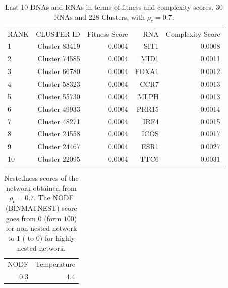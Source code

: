 \documentclass[10pt,a4paper]{article}
\begin{document}
 \begin{table}[h!]
\centering
\caption{\label{tab:tab2} Last 10 DNAs and RNAs in terms of fitness and complexity scores, 30 RNAs and 228 Clusters, with $\rho_{c} = 0.7$.}
\begin{tabular}{l|rr|rr|}
\cline{1-5}
RANK & CLUSTER ID & Fitness Score & RNA & Complexity Score\\
\cline{1-5}
1 & Cluster 83419 & 0.0004 & SIT1 & 0.0008\\
2 & Cluster 74585 & 0.0004 & MID1 & 0.0011\\
3 & Cluster 66780 & 0.0004 & FOXA1 & 0.0012\\
4 & Cluster 58323 & 0.0004 & CCR7 & 0.0013\\
5 & Cluster 55730 & 0.0004 & MLPH & 0.0013\\
6 & Cluster 49933 & 0.0004 & PRR15 & 0.0014\\
7 & Cluster 48271 & 0.0004 & IRF4 & 0.0015\\
8 & Cluster 24558 & 0.0004 & ICOS & 0.0017\\
9 & Cluster 24467 & 0.0004 & ESR1 & 0.0027\\
10 & Cluster 22095 & 0.0004 & TTC6 & 0.0031\\
\cline{1-5}
\end{tabular}
\end{table}
\begin{table}[h!]
\centering
\caption{\label{tab:tab3}Nestedness scores of the network obtained from $\rho_{c} = 0.7$. The NODF (BINMATNEST) score goes from $0$ (form $100$) for non nested network to $1$ ( to $0$) for highly nested network.}
\begin{tabular}{|r|r|}
\cline{1-2}
NODF & Temperature\\
\cline{1-2}
0.3 & 4.4\\
\cline{1-2}
\end{tabular}
\end{table}
\end{document}
